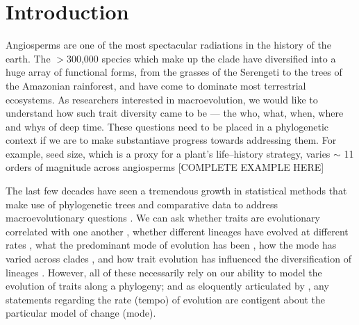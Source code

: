 \documentclass[12pt]{article}
\begin{document}
\section{Introduction}
Angiosperms are one of the most spectacular radiations in the history of the earth. The $>$300,000 species which make up the clade have diversified into a huge array of functional forms, from the grasses of the Serengeti to the trees of the Amazonian rainforest, and have come to dominate most terrestrial ecosystems. As researchers interested in macroevolution, we would like to understand how such trait diversity came to be --- the who, what, when, where and whys of deep time. These questions need to be placed in a phylogenetic context if we are to make substantiave progress towards addressing them. For example, seed size, which is a proxy for a plant's life--history strategy, varies $\sim$ 11 orders of magnitude across angiosperms \citep{Westoby1992TREE, Lord1995AmNat, Westoby2002, Moles2005, Cornwell2013} [COMPLETE EXAMPLE HERE]

The last few decades have seen a tremendous growth in statistical methods that make use of phylogenetic trees and comparative data to address macroevolutionary questions \citep[for a recent review see][]{PennellHarmon}. We can ask whether traits are evolutionary correlated with one another \citep[e.g.][]{Felsenstein1985, Grafen1989}, whether different lineages have evolved at different rates \citep[e.g.][]{Omeara2006, Eastman2011}, what the predominant mode of evolution has been \citep[e.g.][]{HansenMartins1996, Mooers1999, Harmon2010}, how the mode has varied across clades \citep[e.g.][]{ButlerKing2004, Beaulieu2012}, and how trait evolution has influenced the diversification of lineages \citep[e.g.][]{Maddison2007, FitzJohn2010}. However, all of these necessarily rely on our ability to model the evolution of traits along a phylogeny; and as eloquently articulated by \citet{Hunt2012}, any statements regarding the rate (tempo) of evolution are contigent about the particular model of change (mode).
\end{document}
